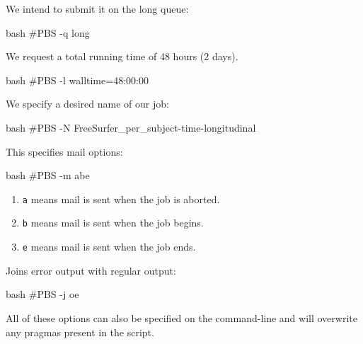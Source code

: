 We intend to submit it on the long queue:

\begin{code}{bash}
  #PBS -q long
\end{code}

We request a total running time of 48 hours (2 days).

\begin{code}{bash}
  #PBS -l walltime=48:00:00
\end{code}

We specify a desired name of our job:

\begin{code}{bash}
  #PBS -N FreeSurfer_per_subject-time-longitudinal
\end{code}

This specifies mail options:

\begin{code}{bash}
  #PBS -m abe
\end{code}

\begin{enumerate}
\item \verb|a| means mail is sent when the job is aborted.
\item \verb|b| means mail is sent when the job begins.
\item \verb|e| means mail is sent when the job ends.
\end{enumerate}

Joins error output with regular output:

\begin{code}{bash}
  #PBS -j oe
\end{code}

All of these options can also be specified on the command-line and will
overwrite any pragmas present in the script.
